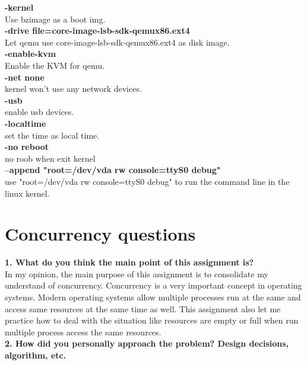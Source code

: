 \documentclass[10pt,letterpaper,titlepage]{article}
\begin{document}
\textbf{-kernel}\\
Use bzimage as a boot img.\\
 
\textbf{-drive file=core-image-lsb-sdk-qemux86.ext4}\\
Let qemu use core-image-lsb-sdk-qemux86.ext4 as disk image.\\
 
\textbf{-enable-kvm}\\
Enable the KVM for qemu.\\
 
\textbf{-net none}\\
kernel won't use any network devices.\\

\textbf{-usb}\\
enable usb devices.\\

\textbf{-localtime}\\
set the time as local time.\\

\textbf{-no reboot}\\
no roob when exit kernel\\

\textbf{--append "root=/dev/vda rw console=ttyS0 debug"}\\
use "root=/dev/vda rw console=ttyS0 debug" to run the command line in the linux kernel.\\


\section{Concurrency questions}

\textbf{}

\textbf{1. What do you think the main point of this assignment is?}\\

In my opinion, the main purpose of this assignment is to consolidate my understand of concurrency. Concurrency is a very important concept in operating systems. Modern operating systems allow multiple processes run at the same and access same resources at the same time as well. This assignment also let me practice how to deal with the situation like resources are empty or full when run multiple process access the same resources.\\

\textbf{2. How did you personally approach the problem? Design decisions, algorithm, etc.}\\
\end{document}
